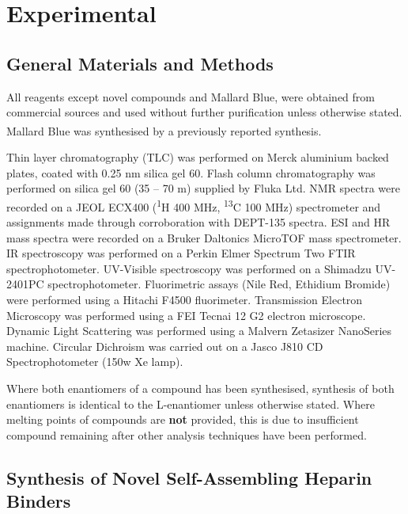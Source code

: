 \chapter{Experimental} %
\label{Chapter5} 
\section{General Materials and Methods}
All reagents except novel compounds and Mallard Blue, were obtained from commercial sources and used without further purification unless otherwise stated. Mallard Blue was synthesised by a previously reported synthesis.\textsuperscript{\cite{Bromfield2013MallardMedia}}

Thin layer chromatography (TLC) was performed on Merck aluminium backed plates, coated with 0.25 nm silica gel 60.
\newline
Flash column chromatography was performed on silica gel 60 (35 – 70 \textmu m) supplied by Fluka Ltd.
\newline
NMR spectra were recorded on a JEOL ECX400 (\textsuperscript{1}H 400 MHz, \textsuperscript{13}C 100 MHz) spectrometer and assignments made through corroboration with DEPT-135 spectra.
\newline
ESI and HR mass spectra were recorded on a Bruker Daltonics MicroTOF mass spectrometer. 
\newline
IR spectroscopy was performed on a Perkin Elmer Spectrum Two FTIR spectrophotometer. 
\newline
UV-Visible spectroscopy was performed on a Shimadzu UV-2401PC spectrophotometer.
\newline
Fluorimetric assays (Nile Red, Ethidium Bromide) were performed using a Hitachi F4500 fluorimeter.
\newline
Transmission Electron Microscopy was performed using a FEI Tecnai 12 G2 electron microscope.
\newline
Dynamic Light Scattering was performed using a Malvern Zetasizer NanoSeries machine. 
\newline
Circular Dichroism was carried out on a Jasco
J810 CD Spectrophotometer (150w Xe lamp).

Where both enantiomers of a compound has been synthesised, synthesis of both enantiomers is identical to the L-enantiomer unless otherwise stated. 
Where melting points of compounds are \textbf{not} provided, this is due to insufficient compound remaining after other analysis techniques have been performed. 

\newpage
\section{Synthesis of Novel Self-Assembling Heparin Binders}

